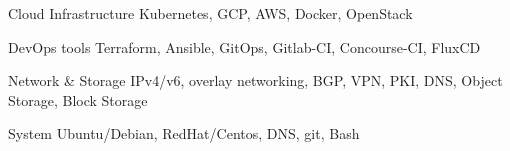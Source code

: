   \cvskill
    {Cloud Infrastructure}
    {Kubernetes, GCP, AWS, Docker, OpenStack}

  \cvskill
    {DevOps tools}
    {Terraform, Ansible, GitOps, Gitlab-CI, Concourse-CI, FluxCD}

  \cvskill
    {Network \& Storage}
    {IPv4/v6, overlay networking, BGP, VPN, PKI, DNS, Object Storage, Block
    Storage}

  \cvskill
    {System}
    {Ubuntu/Debian, RedHat/Centos, DNS, git, Bash}
